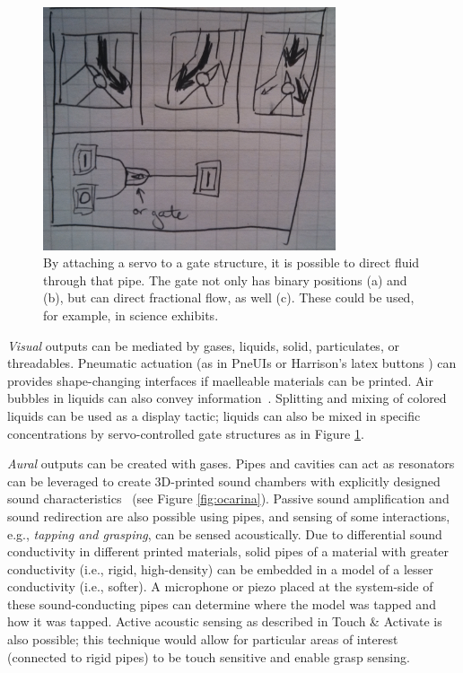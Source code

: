 \begin{figure}[h]
\centering
    \includegraphics[width=3.4in]{figures/placeholder/direct.jpg}
\caption{By attaching a servo to a gate structure, it is possible to direct fluid through that pipe.  The gate not only has binary positions (a) and (b), but can direct fractional flow, as well (c).  These could be used, for example, in science exhibits.}
\label{fig:direct}
\end{figure}

\emph{Visual} outputs can be mediated by gases, liquids, solid, particulates, or threadables.  Pneumatic actuation (as in PneUIs \cite{Yao-pneui} or Harrison's latex buttons \cite{Harrison-buttons}) can provides shape-changing interfaces if maelleable materials can be printed. 
Air bubbles in liquids can also convey information~\cite{Heiner1999Percolator}. Splitting and mixing of colored liquids can be used as a display tactic; liquids can also be mixed in specific concentrations by servo-controlled gate structures as in Figure \ref{fig:direct}. %

\emph{Aural} outputs can be created with gases.  Pipes and cavities can act as resonators can be leveraged to create 3D-printed sound chambers with explicitly designed sound characteristics~\cite{Zoran-flute} (see Figure \ref{fig:ocarina}).  %
Passive sound amplification and sound redirection are also possible using pipes, and sensing of some interactions, e.g., \emph{tapping and grasping}, can be sensed acoustically.  Due to differential sound conductivity in different printed materials, solid pipes of a material with greater conductivity (i.e., rigid, high-density) can be embedded in a model of a lesser conductivity (i.e., softer).  A microphone or piezo placed at the system-side of these sound-conducting pipes can determine where the model was tapped and how it was tapped.  Active acoustic sensing as described in Touch \& Activate \cite{Ono-touchandactivate} is also possible; this technique would allow for particular areas of interest (connected to rigid pipes) to be touch sensitive and enable grasp sensing.

